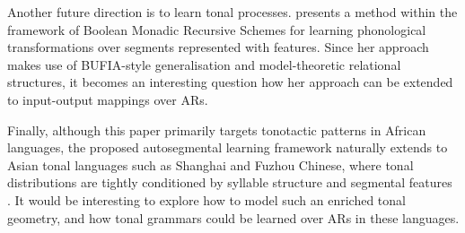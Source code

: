 \documentclass{CUP-JNL-PHO}%
\theoremstyle{definition}
\numberwithin{equation}{section}
\theoremstyle{definition}
\begin{document}
Another future direction is to learn tonal
processes. \citet{Yolyan2025} presents a method within the framework
of Boolean Monadic Recursive Schemes \citep{chandleejardine21bmrs} for
learning phonological transformations over segments represented with
features. Since her approach makes use of BUFIA-style generalisation
and model-theoretic relational structures, it becomes an interesting
question how her approach can be extended to input-output mappings
over ARs.

Finally, although this paper primarily targets tonotactic patterns 
in African languages, the proposed autosegmental learning framework 
naturally extends to Asian tonal languages such as Shanghai and Fuzhou 
Chinese, where tonal distributions are tightly conditioned by syllable 
structure and segmental features \citep{yip2002tone}. %
It would be interesting to explore how to model such 
an enriched tonal geometry, and how tonal grammars could be 
learned over ARs in these languages.
\end{document}
